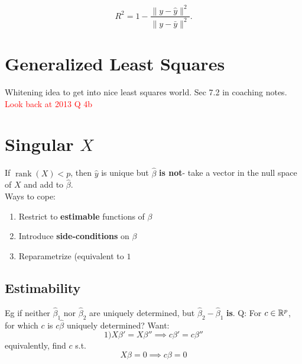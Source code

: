 \documentclass{article}
\newcommand\myworries[1]{\textcolor{red}{#1}}
\newcommand{\rank}{\operatorname{rank}}
\begin{document}
\begin{definition}[$R^2$]
    $$R^2 = 1 - \frac{\|y - \hat y\|^2}{\| y - \bar y\|^2}.$$
\end{definition}

\section{Generalized Least Squares}
Whitening idea to get into nice least squares world. Sec 7.2 in coaching notes. \myworries{Look back at 2013 Q 4b}
\section{Singular $X$}
If $\rank(X)<p$, then $\hat y$ is unique but $\hat \beta$ \textbf{is not}- take a vector in the null space of $X$ and add to $\hat \beta$. \\
Ways to cope:
\begin{enumerate}
    \item Restrict to \textbf{estimable} functions of $\beta$
    \item Introduce \textbf{side-conditions} on $\beta$
    \item Reparametrize (equivalent to $1$

\end{enumerate}
\subsection{Estimability}
Eg if neither $\hat \beta_1$ nor $\hat \beta_2$ are uniquely determined, but $\hat \beta_2 - \hat \beta_1$ \textbf{is}. Q: For $c\in \mathbb R^p$, for which $c$ is $c\hat \beta$ uniquely determined?  Want:
$$1) X\beta' = X\beta '' \implies c\beta' = c\beta'' $$
equivalently, find $c$ s.t.
$$X\beta = 0 \implies c\beta = 0$$
\end{document}
